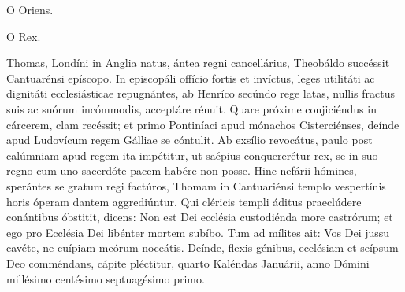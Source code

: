 \begin{caputFesti}
  \dioecBud
\end{caputFesti}

O Oriens.


O Rex.

\begin{caputFesti}
  \dioecBud
\end{caputFesti}





Thomas, Londíni in Anglia natus,
ántea regni cancellárius, Theobáldo succéssit Cantuarénsi epíscopo.
In episcopáli offício fortis et invíctus,
leges utilitáti ac dignitáti ecclesiásticae repugnántes,
ab Henríco secúndo rege latas,
nullis fractus suis ac suórum incómmodis,
acceptáre rénuit.
Quare próxime conjiciéndus in cárcerem, clam recéssit;
et primo Pontiníaci apud mónachos Cisterciénses,
deínde apud Ludovícum regem Gálliae se cóntulit.
Ab exsílio revocátus, paulo post calúmniam apud regem ita impétitur,
ut saépius conquererétur rex,
se in suo regno cum uno sacerdóte pacem habére non posse.
Hinc nefárii hómines, sperántes se gratum regi factúros,
Thomam in Cantuariénsi templo vespertínis horis óperam dantem aggrediúntur.
Qui cléricis templi áditus praeclúdere conántibus óbstitit, dicens:
Non est Dei ecclésia custodiénda more castrórum;
et ego pro Ecclésia Dei libénter mortem subíbo.
Tum ad mílites ait: Vos Dei jussu cavéte,
ne cuípiam meórum noceátis.
Deínde, flexis génibus, ecclésiam et seípsum Deo comméndans,
cápite pléctitur,
quarto Kaléndas Januárii, anno Dómini millésimo centésimo
septuagésimo primo.

\parsTeDeum


